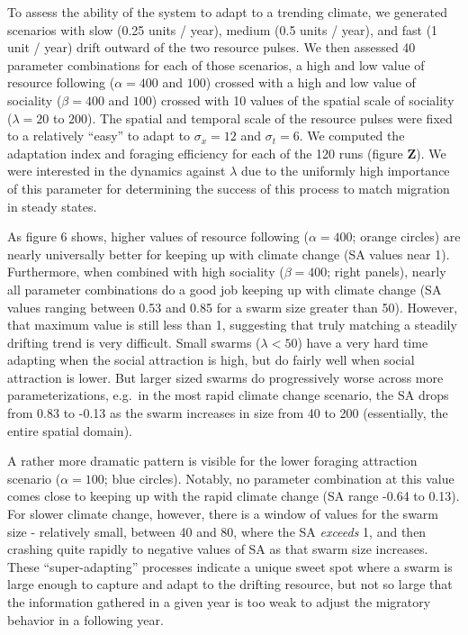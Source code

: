 \documentclass[12pt]{article}
\begin{document}
To assess the ability of the system to adapt to a trending climate, we
generated scenarios with slow (0.25 units / year), medium (0.5 units /
year), and fast (1 unit / year) drift outward of the two resource
pulses. We then assessed 40 parameter combinations for each of those
scenarios, a high and low value of resource following (\(\alpha = 400\)
and \(100\)) crossed with a high and low value of sociality
(\(\beta = 400\) and \(100\)) crossed with 10 values of the spatial
scale of sociality (\(\lambda = 20\) to \(200\)). The spatial and
temporal scale of the resource pulses were fixed to a relatively
``easy'' to adapt to \(\sigma_x = 12\) and \(\sigma_t = 6\). We computed
the adaptation index and foraging efficiency for each of the 120 runs
(figure \textbf{Z}). We were interested in the dynamics against
\(\lambda\) due to the uniformly high importance of this parameter for
determining the success of this process to match migration in steady
states.

As figure 6 shows, higher values of resource following
(\(\alpha = 400\); orange circles) are nearly universally better for
keeping up with climate change (SA values near 1). Furthermore, when
combined with high sociality (\(\beta = 400\); right panels), nearly all
parameter combinations do a good job keeping up with climate change (SA
values ranging between 0.53 and 0.85 for a swarm size greater than 50).
However, that maximum value is still less than 1, suggesting that truly
matching a steadily drifting trend is very difficult. Small swarms
(\(\lambda < 50\)) have a very hard time adapting when the social
attraction is high, but do fairly well when social attraction is lower.
But larger sized swarms do progressively worse across more
parameterizations, e.g.~in the most rapid climate change scenario, the
SA drops from 0.83 to -0.13 as the swarm increases in size from 40 to
200 (essentially, the entire spatial domain).

A rather more dramatic pattern is visible for the lower foraging
attraction scenario (\(\alpha = 100\); blue circles). Notably, no
parameter combination at this value comes close to keeping up with the
rapid climate change (SA range -0.64 to 0.13). For slower climate
change, however, there is a window of values for the swarm size -
relatively small, between 40 and 80, where the SA \emph{exceeds} 1, and
then crashing quite rapidly to negative values of SA as that swarm size
increases. These ``super-adapting'' processes indicate a unique sweet
spot where a swarm is large enough to capture and adapt to the drifting
resource, but not so large that the information gathered in a given year
is too weak to adjust the migratory behavior in a following year.
\end{document}
